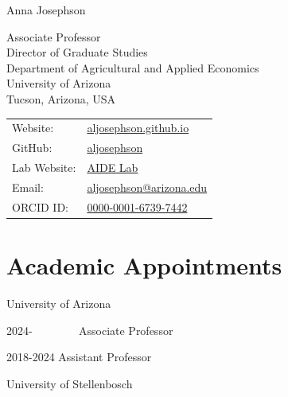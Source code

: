 \documentclass[letterpaper]{article}
\def\name{Anna Josephson}
\begin{document}
{\huge \name}

\vspace{0.25in}

\begin{minipage}{0.60\linewidth} 
	{Associate Professor \\ Director of Graduate Studies} \\
  Department of Agricultural and Applied Economics \\
  University of Arizona \\
  Tucson, Arizona, USA \\
\end{minipage}
\begin{minipage}{0.45\linewidth}
  \begin{tabular}{ll}
  	Website: & \href{https://aljosephson.github.io/}{aljosephson.github.io} \\ 
    GitHub: & \href{https://github.com/aljosephson}{aljosephson} \\
    Lab Website: & \href{aidelab.arizona.edu}{AIDE Lab} \\
    Email: & \href{mailto:aljosephson@arizona.edu}{aljosephson@arizona.edu} \\
    ORCID ID: & \href{https://orcid.org/0000-0001-6739-7442}{0000-0001-6739-7442} \\
  \end{tabular}
\end{minipage}

\renewenvironment{itemize}{
  \begin{list}{}{
    \setlength{\leftmargin}{1.5em}
  }
}{
  \end{list}
}

\section*{Academic Appointments}


\hspace{0.1in} University of Arizona  

 \hspace{0.2in} 2024- \ \ \ \ \ \ \  \hspace{0.2in} Associate Professor 
 
 \hspace{0.2in} 2018-2024 \hspace{0.2in} Assistant Professor

 \hspace{0.1in} University of Stellenbosch  
\end{document}
